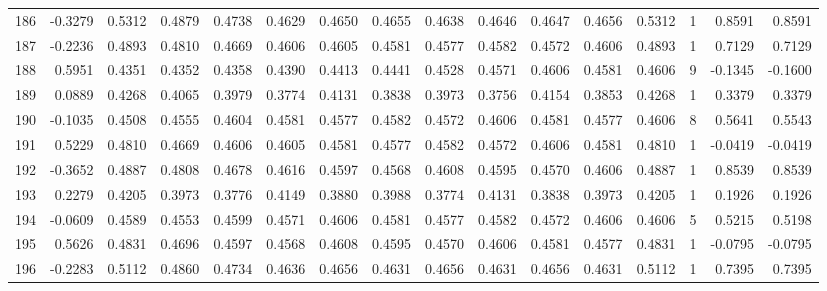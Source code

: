 \begin{tabular}{lrrrrrrrrrrrrrrr}
186 &     -0.3279 &  0.5312 &  0.4879 &  0.4738 &  0.4629 &  0.4650 &  0.4655 &  0.4638 &  0.4646 &  0.4647 &   0.4656 &     0.5312 &      1 &                    0.8591 &                     0.8591 \\
187 &     -0.2236 &  0.4893 &  0.4810 &  0.4669 &  0.4606 &  0.4605 &  0.4581 &  0.4577 &  0.4582 &  0.4572 &   0.4606 &     0.4893 &      1 &                    0.7129 &                     0.7129 \\
188 &      0.5951 &  0.4351 &  0.4352 &  0.4358 &  0.4390 &  0.4413 &  0.4441 &  0.4528 &  0.4571 &  0.4606 &   0.4581 &     0.4606 &      9 &                   -0.1345 &                    -0.1600 \\
189 &      0.0889 &  0.4268 &  0.4065 &  0.3979 &  0.3774 &  0.4131 &  0.3838 &  0.3973 &  0.3756 &  0.4154 &   0.3853 &     0.4268 &      1 &                    0.3379 &                     0.3379 \\
190 &     -0.1035 &  0.4508 &  0.4555 &  0.4604 &  0.4581 &  0.4577 &  0.4582 &  0.4572 &  0.4606 &  0.4581 &   0.4577 &     0.4606 &      8 &                    0.5641 &                     0.5543 \\
191 &      0.5229 &  0.4810 &  0.4669 &  0.4606 &  0.4605 &  0.4581 &  0.4577 &  0.4582 &  0.4572 &  0.4606 &   0.4581 &     0.4810 &      1 &                   -0.0419 &                    -0.0419 \\
192 &     -0.3652 &  0.4887 &  0.4808 &  0.4678 &  0.4616 &  0.4597 &  0.4568 &  0.4608 &  0.4595 &  0.4570 &   0.4606 &     0.4887 &      1 &                    0.8539 &                     0.8539 \\
193 &      0.2279 &  0.4205 &  0.3973 &  0.3776 &  0.4149 &  0.3880 &  0.3988 &  0.3774 &  0.4131 &  0.3838 &   0.3973 &     0.4205 &      1 &                    0.1926 &                     0.1926 \\
194 &     -0.0609 &  0.4589 &  0.4553 &  0.4599 &  0.4571 &  0.4606 &  0.4581 &  0.4577 &  0.4582 &  0.4572 &   0.4606 &     0.4606 &      5 &                    0.5215 &                     0.5198 \\
195 &      0.5626 &  0.4831 &  0.4696 &  0.4597 &  0.4568 &  0.4608 &  0.4595 &  0.4570 &  0.4606 &  0.4581 &   0.4577 &     0.4831 &      1 &                   -0.0795 &                    -0.0795 \\
196 &     -0.2283 &  0.5112 &  0.4860 &  0.4734 &  0.4636 &  0.4656 &  0.4631 &  0.4656 &  0.4631 &  0.4656 &   0.4631 &     0.5112 &      1 &                    0.7395 &                     0.7395 \\

\end{tabular}
